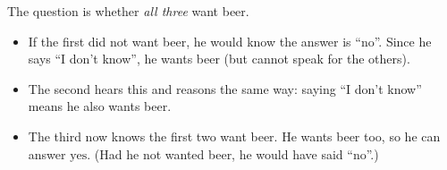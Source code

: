 The question is whether \emph{all three} want beer.
\begin{itemize}
\item If the first did not want beer, he would know the answer is ``no''. Since he says ``I don't know'', he wants beer (but cannot speak for the others).
\item The second hears this and reasons the same way: saying ``I don't know'' means he also wants beer.
\item The third now knows the first two want beer. He wants beer too, so he can answer $\boxed{\text{yes}}$. (Had he not wanted beer, he would have said ``no''.)
\end{itemize}
